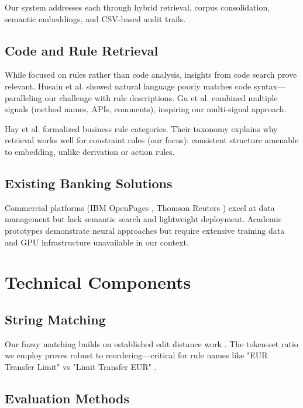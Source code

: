 Our system addresses each through hybrid retrieval, corpus consolidation, semantic embeddings, and CSV-based audit trails.

\subsection{Code and Rule Retrieval}

While focused on rules rather than code analysis, insights from code search prove relevant. Husain et al. \cite{husain2019codesearch} showed natural language poorly matches code syntax—paralleling our challenge with rule descriptions. Gu et al. \cite{gu2018deepcode} combined multiple signals (method names, APIs, comments), inspiring our multi-signal approach.

Hay et al. \cite{hay2006defining} formalized business rule categories. Their taxonomy explains why retrieval works well for constraint rules (our focus): consistent structure amenable to embedding, unlike derivation or action rules.

\subsection{Existing Banking Solutions}

Commercial platforms (IBM OpenPages \cite{ibm2022openpages}, Thomson Reuters \cite{thomson2022regulatory}) excel at data management but lack semantic search and lightweight deployment. Academic prototypes \cite{zhang2020regulatory,zhong2021does} demonstrate neural approaches but require extensive training data and GPU infrastructure unavailable in our context.

\section{Technical Components}

\subsection{String Matching}

Our fuzzy matching builds on established edit distance work \cite{navarro2001guided,levenshtein1966}. The token-set ratio we employ \cite{fuzzywuzzy2011} proves robust to reordering—critical for rule names like "EUR Transfer Limit" vs "Limit Transfer EUR" \cite{cohen2003comparison}.

\subsection{Evaluation Methods}


